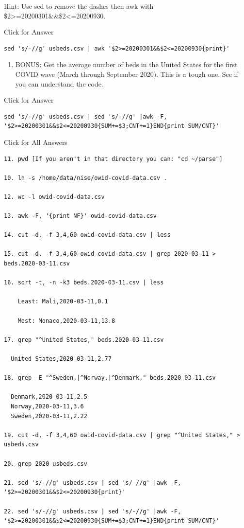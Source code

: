 \documentclass[
]{book}
\providecommand{\tightlist}{%
  \setlength{\itemsep}{0pt}\setlength{\parskip}{0pt}}
\begin{document}
Hint: Use sed to remove the dashes then awk with \$2\textgreater=20200301\&\&\$2\textless=20200930.

Click for Answer

\begin{verbatim}
sed 's/-//g' usbeds.csv | awk '$2>=20200301&&$2<=20200930{print}'
\end{verbatim}

\hfill\break

\begin{enumerate}
\def\labelenumi{\arabic{enumi}.}
\setcounter{enumi}{21}
\tightlist
\item
  BONUS: Get the average number of beds in the United States for the first COVID wave (March through September 2020). This is a tough one. See if you can understand the code.
\end{enumerate}

Click for Answer

\begin{verbatim}
sed 's/-//g' usbeds.csv | sed 's/-//g' |awk -F, '$2>=20200301&&$2<=20200930{SUM+=$3;CNT+=1}END{print SUM/CNT}'
\end{verbatim}

\hfill\break

Click for All Answers

\begin{verbatim}
11. pwd [If you aren't in that directory you can: "cd ~/parse"]

10. ln -s /home/data/nise/owid-covid-data.csv . 

12. wc -l owid-covid-data.csv

13. awk -F, '{print NF}' owid-covid-data.csv

14. cut -d, -f 3,4,60 owid-covid-data.csv | less

15. cut -d, -f 3,4,60 owid-covid-data.csv | grep 2020-03-11 > beds.2020-03-11.csv

16. sort -t, -n -k3 beds.2020-03-11.csv | less

    Least: Mali,2020-03-11,0.1
    
    Most: Monaco,2020-03-11,13.8

17. grep "^United States," beds.2020-03-11.csv

  United States,2020-03-11,2.77

18. grep -E "^Sweden,|^Norway,|^Denmark," beds.2020-03-11.csv

  Denmark,2020-03-11,2.5
  Norway,2020-03-11,3.6
  Sweden,2020-03-11,2.22

19. cut -d, -f 3,4,60 owid-covid-data.csv | grep "^United States," > usbeds.csv

20. grep 2020 usbeds.csv

21. sed 's/-//g' usbeds.csv | sed 's/-//g' |awk -F, '$2>=20200301&&$2<=20200930{print}'

22. sed 's/-//g' usbeds.csv | sed 's/-//g' |awk -F, '$2>=20200301&&$2<=20200930{SUM+=$3;CNT+=1}END{print SUM/CNT}'

\end{verbatim}
\end{document}

